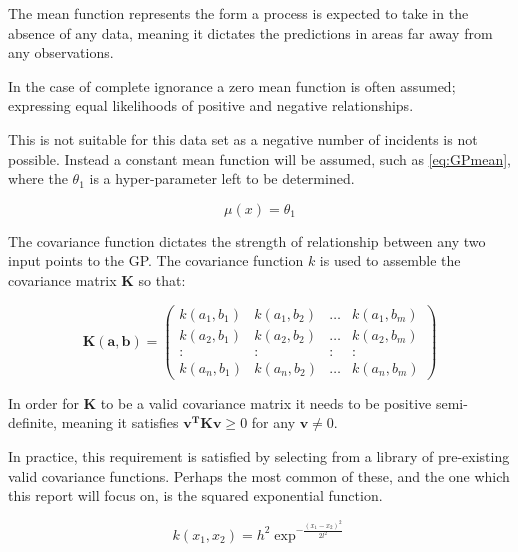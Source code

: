 \documentclass[a4paper,11pt]{report}
\begin{document}
The mean function represents the form a process is expected to take in the absence of any data, meaning it dictates the predictions in areas far away from any observations.

In the case of complete ignorance a zero mean function is often assumed; expressing equal likelihoods of positive and negative relationships. 

This is not suitable for this data set as a negative number of incidents is not possible. Instead a constant mean function will be assumed, such as \ref{eq:GPmean}, where the \(\theta_1\) is a hyper-parameter left to be determined.

\begin{equation} \label{eq:GPmean}
\mu (x) = \theta_1
\end{equation}

\par

The covariance function dictates the strength of relationship between any two input points to the GP. The covariance function \(k\) is used to assemble the covariance matrix \(\mathbf{K}\) so that: 

\begin{equation}
\mathbf{K(a,b)} =  \left( \begin{array}{cccc}
k(a_1,b_1) & k(a_1,b_2) &  \dots & k(a_1,b_m) \\
k(a_2,b_1) & k(a_2,b_2) &  \dots & k(a_2,b_m) \\
: & : & : & : \\
k(a_n,b_1) & k(a_n,b_2) &  \dots & k(a_n,b_m)  \end{array} \right) 
\end{equation}

In order for \(\mathbf{K}\) to be a valid covariance matrix it needs to be positive semi-definite, meaning it satisfies \( \mathbf{v^{T} K v} \geq 0\) for any \( \mathbf{v} \neq 0 \).

In practice, this requirement is satisfied by selecting from a library of pre-existing valid covariance functions. Perhaps the most common of these, and the one which this report will focus on, is the squared exponential function.

\begin{equation}
k(x_1,x_2) = h^2 \exp^{- \frac{(x_1-x_2)^2}{2 l^2}}
\end{equation} 
\end{document}
